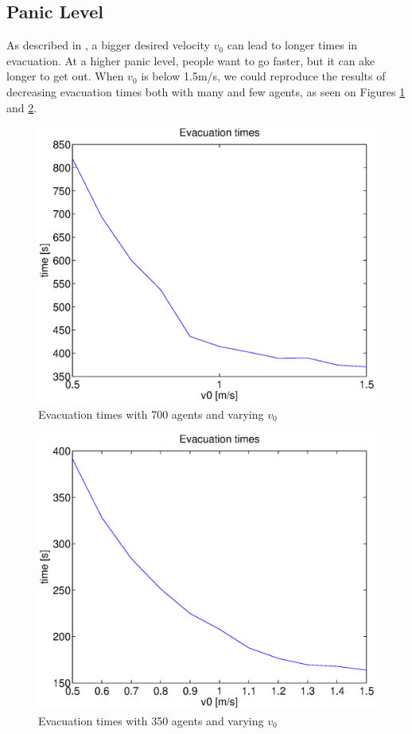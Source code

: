 \documentclass[11pt]{article}
\begin{document}

\subsection{Panic Level} %
As described in \cite{helbing}, a bigger desired velocity \(v_0\) 
can lead to longer times in evacuation.
At a higher panic level, people want to go faster, but it can ake longer to get out.
When \(v_0\) is below 1.5m/s, we could reproduce the results of decreasing evacuation times
both with many and few agents, as seen on Figures \ref{evactimes1to11} and \ref{evactimes23to33}.

\begin{figure}[h]
	\centering
	\includegraphics[scale=0.5]{images/evactimes1to11.eps}
	\caption{Evacuation times with 700 agents and varying \(v_0\) 	}
	\label{evactimes1to11}
\end{figure}

\begin{figure}[h]
	\centering
	\includegraphics[scale=0.5]{images/evactimes23to33.eps}
	\caption{Evacuation times with 350 agents and varying \(v_0\) 	}
	\label{evactimes23to33}
\end{figure}
\end{document}
